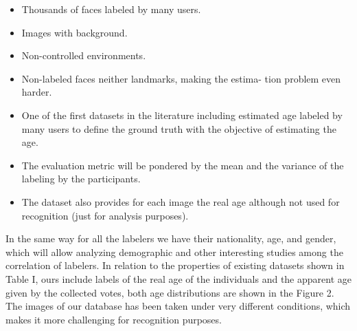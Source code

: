 \begin{itemize}
	\item Thousands of faces labeled by many users.
	\item Images with background.
	\item Non-controlled environments.
	\item Non-labeled faces neither landmarks, making the estima-
	tion problem even harder.
	\item One of the first datasets in the literature including
	estimated age labeled by many users to define the ground truth
	with the objective of estimating the age.
	\item The evaluation metric will be pondered by the mean and
	the variance of the labeling by the participants.
	\item The dataset also provides for each image the real age
	although not used for recognition (just for analysis purposes).
\end{itemize}

In the same way for all the labelers we have their nationality, age, and gender, which will allow analyzing demographic and other interesting studies among the correlation of labelers. In relation to the properties of existing datasets shown in Table I, ours include labels of the real age of the individuals and the apparent age given by the collected votes, both age distributions are shown in the Figure 2. The images of our database has been taken under very different conditions, which makes it more challenging for recognition purposes.
